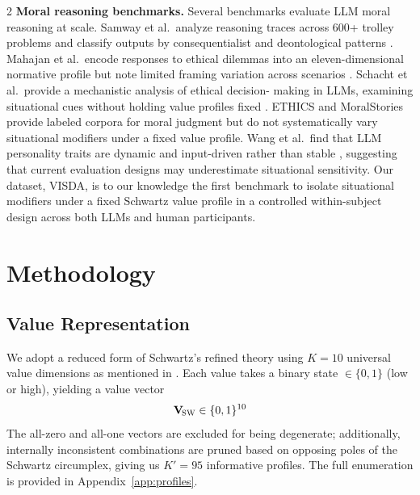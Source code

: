 \documentclass[11pt]{article}
\newcommand{\Vsw}{\mathbf{V}_{\!\textsc{SW}}}
\begin{document}
\begin{multicols}{2}
\textbf{Moral reasoning benchmarks.}
Several benchmarks evaluate LLM moral reasoning at scale. Samway 
et al.\ analyze reasoning traces across 600+ trolley problems and 
classify outputs by consequentialist and deontological patterns 
\citep{samway2025language}. Mahajan et al.\ encode responses to 
ethical dilemmas into an eleven-dimensional normative profile but note 
limited framing variation across scenarios \citep{mahajan2025mapping}. 
Schacht et al.\ provide a mechanistic analysis of ethical decision-
making in LLMs, examining situational cues without holding value 
profiles fixed \citep{schacht2025mapping}. ETHICS \citep{hendrycks2021ethics} 
and MoralStories \citep{emelin2021moral} provide labeled corpora for 
moral judgment but do not systematically vary situational modifiers 
under a fixed value profile. Wang et al.\ find that LLM personality 
traits are dynamic and input-driven rather than stable 
\citep{jiaqi2025comparative}, suggesting that current evaluation designs 
may underestimate situational sensitivity. Our dataset, VISDA, is to 
our knowledge the first benchmark to isolate situational modifiers 
under a fixed Schwartz value profile in a controlled within-subject 
design across both LLMs and human participants.

\section{Methodology}
\label{sec:method}

\subsection{Value Representation}

We adopt a reduced form of Schwartz’s refined theory using $K = 10$ universal value dimensions as mentioned in \citep{schwartz1992universals}. Each value takes a binary state $\in \{0,1\}$ (low or high), yielding a value vector
    \textbf{\[
    \Vsw \in \{0,1\}^{10}
    \]}
The all-zero and all-one vectors are excluded for being degenerate; additionally, internally inconsistent combinations are pruned based on opposing poles of the Schwartz circumplex, giving us $K' = 95$ informative profiles. The full enumeration is provided in Appendix~\ref{app:profiles}.



\end{multicols}
\end{document}
